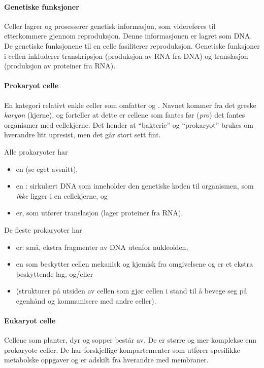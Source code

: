 \paragraph{Genetiske funksjoner} Celler lagrer og prosesserer genetisk informasjon, som videreføres til etterkommere gjennom reproduksjon. Denne informasjonen er lagret som DNA. De genetiske funksjonene til en celle fasiliterer reproduksjon. Genetiske funksjoner i cellen inkluderer transkripsjon (produksjon av RNA fra DNA) og translasjon (produksjon av proteiner fra RNA).

\paragraph{Prokaryot celle} En kategori relativt enkle celler som omfatter  og . Navnet kommer fra det greske \emph{karyon} (kjerne), og forteller at dette er cellene som fantes før (\emph{pro}) det fantes organismer med cellekjerne. Det hender at ``bakterie'' og ``prokaryot'' brukes om hverandre litt upresist, men det går stort sett fint.

\noindent Alle prokaryoter har
\begin{itemize}[nolistsep,noitemsep]
	\item en  (se eget avsnitt),
	\item en : sirkulært DNA som inneholder den genetiske koden til organismen, som \emph{ikke} ligger i en cellekjerne, og
	\item {}er, som utfører translasjon (lager proteiner fra RNA). 
\end{itemize}
\noindent De fleste prokaryoter har
\begin{itemize}[nolistsep,noitemsep]
	\item {}er: små, ekstra fragmenter av DNA utenfor nukleoiden,
	\item en  som beskytter cellen mekanisk og kjemisk fra omgivelsene og er et ekstra beskyttende lag, og/eller
	\item {} (strukturer på utsiden av cellen som gjør cellen i stand til å bevege seg på egenhånd og kommunisere med andre celler).
\end{itemize}

\paragraph{Eukaryot celle} Cellene som planter, dyr og sopper består av. De er større og mer komplekse enn prokaryote celler. De har forskjellige kompartementer som utfører spesifikke metabolske oppgaver og er adskilt fra hverandre med membraner.

